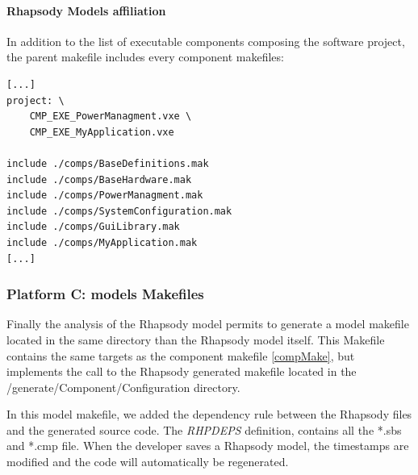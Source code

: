 \documentclass[dvips]{imsart}
\begin{document}
\paragraph{Rhapsody Models affiliation}
In addition to the list of executable components composing the software
project, the parent makefile includes every component makefiles:

\begin{lstlisting}
[...]
project: \
    CMP_EXE_PowerManagment.vxe \
    CMP_EXE_MyApplication.vxe
   
include ./comps/BaseDefinitions.mak
include ./comps/BaseHardware.mak
include ./comps/PowerManagment.mak
include ./comps/SystemConfiguration.mak
include ./comps/GuiLibrary.mak
include ./comps/MyApplication.mak
[...]
\end{lstlisting}

\subsubsection{Platform C: models Makefiles}
Finally the analysis of the Rhapsody model permits to generate a model
makefile located in the same directory than the Rhapsody model itself.
This Makefile contains the same targets as the component makefile
\ref{compMake}, but implements the call to the Rhapsody generated makefile located in the
/generate/Component/Configuration directory.

In this model makefile, we added the dependency rule between the
Rhapsody files and the generated source code. The \emph{RHPDEPS}
definition, contains all the *.sbs and *.cmp file. When the developer saves a
Rhapsody model, the timestamps are modified and the code will automatically be
regenerated.
\end{document}
